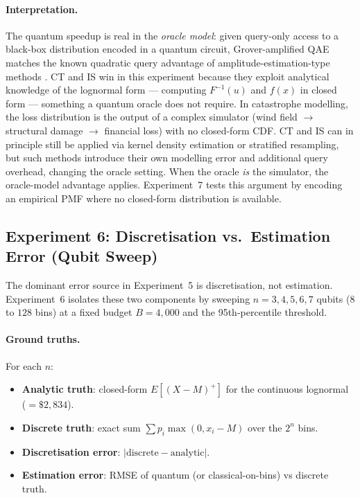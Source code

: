 \documentclass[11pt,a4paper]{article}
\begin{document}
\paragraph{Interpretation.} The quantum speedup is real in the \emph{oracle model}: given query-only access to a black-box distribution encoded in a quantum circuit, Grover-amplified QAE matches the known quadratic query advantage of amplitude-estimation-type methods \citep{brassard2002quantum}. CT and IS win in this experiment because they exploit analytical knowledge of the lognormal form --- computing $F^{-1}(u)$ and $f(x)$ in closed form --- something a quantum oracle does not require. In catastrophe modelling, the loss distribution is the output of a complex simulator (wind field $\to$ structural damage $\to$ financial loss) with no closed-form CDF. CT and IS can in principle still be applied via kernel density estimation or stratified resampling, but such methods introduce their own modelling error and additional query overhead, changing the oracle setting. When the oracle \emph{is} the simulator, the oracle-model advantage applies. Experiment~7 tests this argument by encoding an empirical PMF where no closed-form distribution is available.


\subsection{Experiment 6: Discretisation vs.\ Estimation Error (Qubit Sweep)}

The dominant error source in Experiment~5 is discretisation, not estimation. Experiment~6 isolates these two components by sweeping $n = 3, 4, 5, 6, 7$ qubits ($8$ to $128$ bins) at a fixed budget $B = 4{,}000$ and the 95th-percentile threshold.

\paragraph{Ground truths.} For each $n$:
\begin{itemize}[nosep]
  \item \textbf{Analytic truth}: closed-form $E[(X-M)^+]$ for the continuous lognormal ($= \$2{,}834$).
  \item \textbf{Discrete truth}: exact sum $\sum p_i \max(0, x_i - M)$ over the $2^n$ bins.
  \item \textbf{Discretisation error}: $|\text{discrete} - \text{analytic}|$.
  \item \textbf{Estimation error}: RMSE of quantum (or classical-on-bins) vs discrete truth.
\end{itemize}
\end{document}
